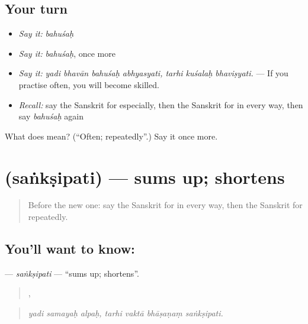 \subsection*{Your turn}
\begin{itemize}
\raggedright
  \item \emph{Say it:} \emph{bahuśaḥ}
  \item \emph{Say it:} \emph{bahuśaḥ}, once more
  \item \emph{Say it:} \emph{yadi bhavān bahuśaḥ abhyasyati, tarhi kuśalaḥ bhaviṣyati.} — If you practise often, you will become skilled.
  \item \emph{Recall:} say the Sanskrit for especially, then the Sanskrit for in every way, then say \emph{bahuśaḥ} again
\end{itemize}

\begin{tcolorbox}[breakable,colback=teal!4,colframe=teal!35!black,title={Before you move on}]
What does  mean? (\textquotedblleft{}Often; repeatedly\textquotedblright{}.) Say it once more.
\end{tcolorbox}
\section[\texorpdfstring{\sk{संक्षिपति} (saṅkṣipati)}{संक्षिपति (saṅkṣipati)}]{ (saṅkṣipati) — sums up; shortens}

\label{lesson:SA-C381-sanksipati}



\begin{quote}
Before the new one: say the Sanskrit for in every way, then the Sanskrit for repeatedly.
\end{quote}

\subsection*{You'll want to know: }
\textbf{} — \emph{saṅkṣipati} — \textquotedblleft{}sums up; shortens\textquotedblright{}.

\begin{quote}
  ,    
\end{quote}

\begin{quote}
\emph{yadi samayaḥ alpaḥ, tarhi vaktā bhāṣaṇaṃ saṅkṣipati.}
\end{quote}

